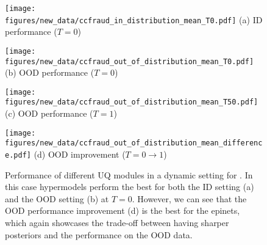 \begin{figure}[h]
\centering
\begin{minipage}[b]{0.24\textwidth}
\centering
\texttt{[image: figures/new\_data/ccfraud\_in\_distribution\_mean\_T0.pdf]}
{\small{{(a)} ID performance ($T=0$) }}  
\end{minipage}
\hfill
\begin{minipage}[b]{0.24\textwidth}
\centering \texttt{[image: figures/new\_data/ccfraud\_out\_of\_distribution\_mean\_T0.pdf]}
{\small{{(b)} OOD performance ($T=0$) }} 
\end{minipage}
\hfill
\begin{minipage}[b]{0.24\textwidth}
\centering \texttt{[image: figures/new\_data/ccfraud\_out\_of\_distribution\_mean\_T50.pdf]}
{\small{{(c)} OOD performance ($T= 1$) }} 
\end{minipage}
\hfill
\begin{minipage}[b]{0.24\textwidth}
\centering \texttt{[image: figures/new\_data/ccfraud\_out\_of\_distribution\_mean\_difference.pdf]}
{\small{{(d)} OOD improvement ($T=0 \to 1$) }} 
\end{minipage}
\caption{Performance of different UQ modules in a dynamic setting for \ccfraud. 
In this case hypermodels perform the best for both the ID setting (a) and the OOD setting (b) at $T=0$. However, we can see that the OOD performance improvement (d) is the best for the epinets, which again showcases the trade-off between having sharper posteriors and the performance on the  OOD data.}
\label{fig:dynamic_setting_ccfraud}
\end{figure}


